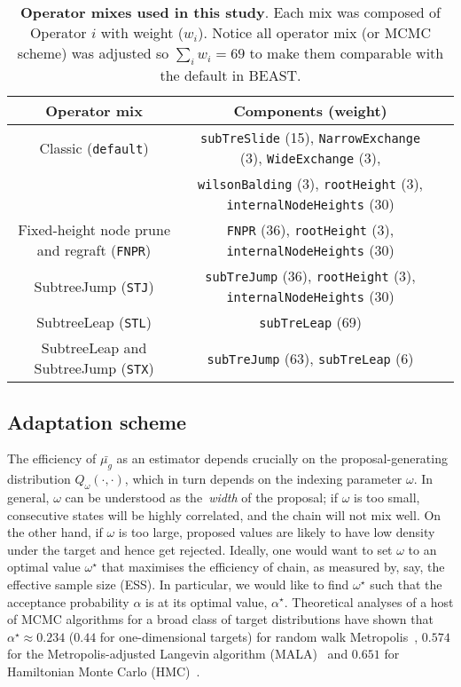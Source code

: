 \begin{sidewaystable}[!ht]
\caption[Operator mixes used in this study.]{\textbf{Operator mixes used in this study}.
Each mix was composed of Operator $i$ with weight ($w_i$).
Notice all operator mix (or MCMC scheme) was adjusted so $\sum_i w_i = 69$ to make them comparable with the default in BEAST.
}
\begin{center}
\begin{tabular}{ccc}
\toprule
Operator mix &  Components (weight) \\             
\midrule
Classic (\verb|default|) &  \verb|subTreSlide| (15), \verb|NarrowExchange| (3), \verb|WideExchange| (3), \\ &  \verb|wilsonBalding| (3), \verb|rootHeight| (3), \verb|internalNodeHeights| (30) \\
Fixed-height node prune and regraft (\verb|FNPR|) &  \verb|FNPR| (36), \verb|rootHeight| (3), \verb|internalNodeHeights| (30) \\
SubtreeJump  (\verb|STJ|) &  \verb|subTreJump| (36), \verb|rootHeight| (3), \verb|internalNodeHeights| (30)\\
SubtreeLeap (\verb|STL|) &  \verb|subTreLeap| (69)\\
SubtreeLeap and SubtreeJump (\verb|STX|) & \verb|subTreJump| (63), \verb|subTreLeap| (6) \\
\bottomrule
\end{tabular}
\end{center}
 \label{tab:operator_mixes}
\end{sidewaystable}

\subsection{Adaptation scheme}

The efficiency of $\bar{\mu_g}$ as an estimator depends crucially on the proposal-generating distribution $Q_\omega(\cdot, \cdot)$, which in turn depends on the indexing parameter $\omega$.
In general, $\omega$ can be understood as the~\textit{width} of the proposal; if $\omega$ is too small, consecutive states will be highly correlated, and the chain will not mix well.
On the other hand, if $\omega$ is too large, proposed values are likely to have low density under the target and hence get rejected.
Ideally, one would want to set $\omega$ to an optimal value $\omega^\star$ that maximises the efficiency of chain, as measured by, say, the effective sample size (ESS).
In particular, we would like to find $\omega^\star$ such that the acceptance probability $\alpha$ is at its optimal value, $\alpha^\star$.
Theoretical analyses of a host of MCMC algorithms for a broad class of target distributions have shown that $\alpha^\star \approx 0.234$ ($0.44$ for one-dimensional targets) for random walk Metropolis~\citep{Roberts1997,Roberts2001}, $0.574$ for the Metropolis-adjusted Langevin algorithm (MALA)~\citep{Roberts2001} and $0.651$ for Hamiltonian Monte Carlo (HMC)~\citep{Beskos2013}.

